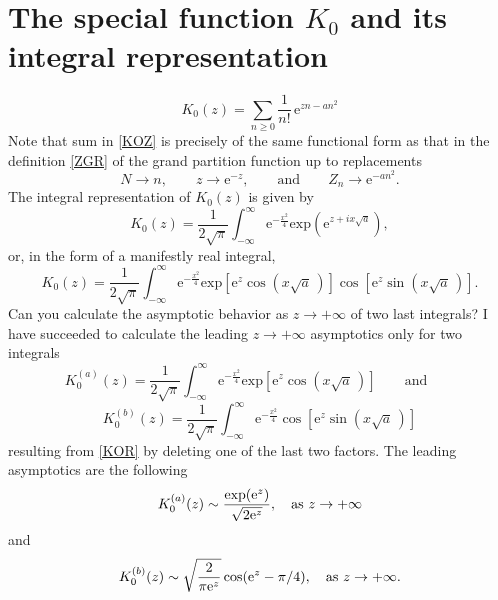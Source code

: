 \documentclass[12pt]{article}
\numberwithin{equation}{section}
\newcommand{\be}{\begin{equation}}
\newcommand{\ee}{\end{equation}}
\newcommand{\e}{\mbox{e}}
\newcommand {\MM}[1]{\qquad\mbox{#1}\qquad}
\begin{document}
	\section{The special function $K_0$ and its integral representation}
	\be\label{KOZ}
	K_0(z)=\sum_{n\ge0}\frac1{n!}\,\e^{zn-an^2}
	\ee
	Note that sum in \eqref{KOZ} is precisely of the same functional form as that in the definition \eqref{ZGR} of the grand partition function up to replacements
	\be
	N\to n,\qquad z\to\e^{-z},\MM{and}Z_n\to\e^{-an^2}.
	\ee
	The integral representation of $K_0(z)$ is given by
	\be
	K_0(z)=\frac1{2\sqrt\pi}\int_{-\infty}^\infty\e^{-\frac{x^2}4}
	\mbox{exp}\left(\e^{z+ix\sqrt a}\right),
	\ee
	or, in the form of a manifestly real integral,
	\be\label{KOR}
	K_0(z)=\frac1{2\sqrt\pi}\int_{-\infty}^\infty\e^{-\frac{x^2}4}
	\mbox{exp}\left[\e^z\cos(x\sqrt a\,)\right]
	\cos\left[\e^z\sin(x\sqrt a\,)\right].
	\ee
	Can you calculate the asymptotic behavior as $z\to+\infty$ of two last integrals?
	I have succeeded to calculate the leading $z\to+\infty$ asymptotics only for two integrals
	\be
	K_0^{(a)}(z) = \frac1{2\sqrt\pi} \int_{-\infty}^\infty\e^{-\frac{x^2}4}
	\mbox{exp}\left[\e^z\cos(x\sqrt a\,)\right]\qquad\mbox{and}\qquad
	\ee
	\be
	K_0^{(b)}(z) = \frac1{2\sqrt\pi} \int_{-\infty}^\infty\e^{-\frac{x^2}4}
	\cos\left[\e^z\sin(x\sqrt a\,)\right]
	\ee
	resulting from \eqref{KOR} by deleting one of the last two factors.
	The leading asymptotics are the following
	\begin{equation}
		K_0^{(a)}(z) \sim \frac{\exp({\rm e}^z)}{\sqrt{2 {\rm e}^z}}, \quad \text{as } z \to +\infty
	\end{equation}
	and
	\begin{equation}
		K_0^{(b)}(z) \sim \sqrt{\frac{2}{\pi {\rm e}^z}} \cos({\rm e}^z - \pi/4), \quad \text{as } z \to +\infty.
	\end{equation}
	
	\appendix
	
\end{document}
